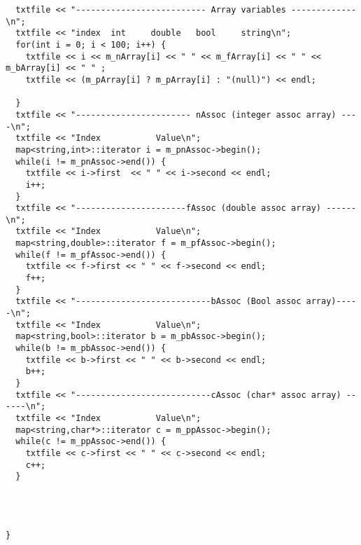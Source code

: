 \begin{verbatim}
  txtfile << "-------------------------- Array variables -------------\n";
  txtfile << "index  int     double   bool     string\n";
  for(int i = 0; i < 100; i++) {
    txtfile << i << m_nArray[i] << " " << m_fArray[i] << " " << m_bArray[i] << " " ;
    txtfile << (m_pArray[i] ? m_pArray[i] : "(null)") << endl;

  }
  txtfile << "----------------------- nAssoc (integer assoc array) ----\n";
  txtfile << "Index           Value\n";
  map<string,int>::iterator i = m_pnAssoc->begin();
  while(i != m_pnAssoc->end()) {
    txtfile << i->first  << " " << i->second << endl;
    i++;
  }
  txtfile << "----------------------fAssoc (double assoc array) ------\n";
  txtfile << "Index           Value\n";
  map<string,double>::iterator f = m_pfAssoc->begin();
  while(f != m_pfAssoc->end()) {
    txtfile << f->first << " " << f->second << endl;
    f++;
  }
  txtfile << "---------------------------bAssoc (Bool assoc array)-----\n";
  txtfile << "Index           Value\n";
  map<string,bool>::iterator b = m_pbAssoc->begin();
  while(b != m_pbAssoc->end()) {
    txtfile << b->first << " " << b->second << endl;
    b++;
  }
  txtfile << "---------------------------cAssoc (char* assoc array) ------\n";
  txtfile << "Index           Value\n";
  map<string,char*>::iterator c = m_ppAssoc->begin();
  while(c != m_ppAssoc->end()) {
    txtfile << c->first << " " << c->second << endl;
    c++;                        
  }


  
  
}
\end{verbatim}\normalsize 


